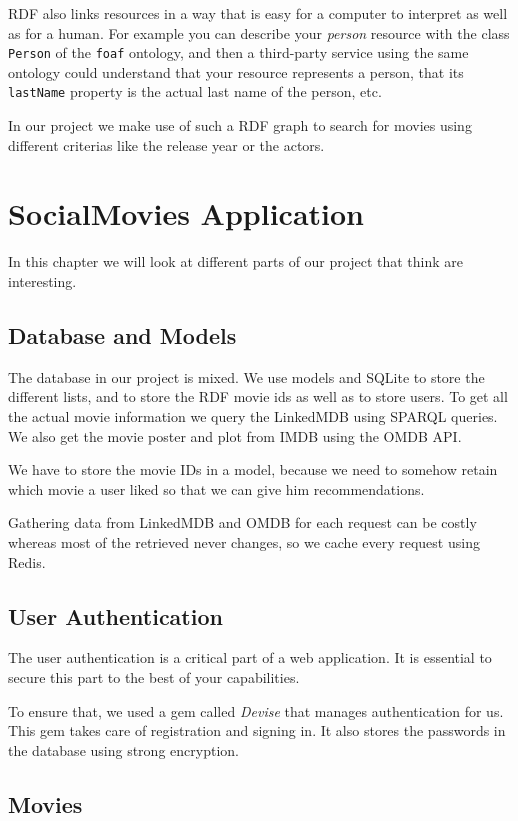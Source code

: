 \documentclass[12pt,a4paper]{article}
\begin{document}
RDF also links resources in a way that is easy for a computer to interpret as well as for a human. For example you can describe your \textit{person} resource with the class \texttt{Person} of the \texttt{foaf} ontology, and then a third-party service using the same ontology could understand that your resource represents a person, that its \texttt{lastName} property is the actual last name of the person, etc.

In our project we make use of such a RDF graph to search for movies using different criterias like the release year or the actors.

\section{SocialMovies Application}\label{app}

In this chapter we will look at different parts of our project that think are interesting.

\subsection{Database and Models}
The database in our project is mixed. We use models and SQLite to store the different lists, and to store the RDF movie ids as well as to store users. To get all the actual movie information we query the LinkedMDB using SPARQL queries. We also get the movie poster and plot from IMDB using the OMDB API.

We have to store the movie IDs in a model, because we need to somehow retain which movie a user liked so that we can give him recommendations.

Gathering data from LinkedMDB and OMDB for each request can be costly whereas most of the retrieved never changes, so we cache every request using Redis.

\subsection{User Authentication}
The user authentication is a critical part of a web application. It is essential to secure this part to the best of your capabilities.

To ensure that, we used a gem called \textit{Devise} that manages authentication for us. This gem takes care of registration and signing in. It also stores the passwords in the database using strong encryption.

\subsection{Movies}
\end{document}
